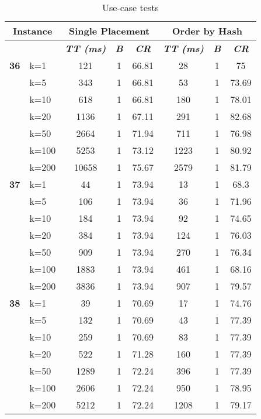     \begin{table}[htbp]
    \caption{Use-case tests}
    \centering
    \begin{tabular}{|l|l|c|c|c|c|c|c|}
    
    \multicolumn{ 2}{|c|}{\textbf{Instance}} & \multicolumn{ 3}{c|}{\textbf{Single Placement}} & \multicolumn{ 3}{c|}{\textbf{Order by Hash}} \\ \hline
    \multicolumn{ 2}{|l|}{} & \textbf{\textit{TT (ms)}} & \textbf{\textit{B}} & \textbf{\textit{CR}} & \textbf{\textit{TT (ms)}} & \textbf{\textit{B}} & \textbf{\textit{CR}} \\ \hline
    \multicolumn{1}{|r|}{\textbf{36}} & k=1 & 121 & 1 & 66.81 & 28 & 1 & 75 \\ 
     & k=5 & 343 & 1 & 66.81 & 53 & 1 & 73.69 \\ 
     & k=10 & 618 & 1 & 66.81 & 180 & 1 & 78.01 \\ 
     & k=20 & 1136 & 1 & 67.11 & 291 & 1 & 82.68 \\ 
     & k=50 & 2664 & 1 & 71.94 & 711 & 1 & 76.98 \\ 
     & k=100 & 5253 & 1 & 73.12 & 1223 & 1 & 80.92 \\ 
     & k=200 & 10658 & 1 & 75.67 & 2579 & 1 & 81.79 \\ \hline
    \multicolumn{1}{|r|}{\textbf{37}} & k=1 & 44 & 1 & 73.94 & 13 & 1 & 68.3 \\ 
     & k=5 & 106 & 1 & 73.94 & 36 & 1 & 71.96 \\ 
     & k=10 & 184 & 1 & 73.94 & 92 & 1 & 74.65 \\ 
     & k=20 & 384 & 1 & 73.94 & 124 & 1 & 76.03 \\ 
     & k=50 & 909 & 1 & 73.94 & 270 & 1 & 76.34 \\ 
     & k=100 & 1883 & 1 & 73.94 & 461 & 1 & 68.16 \\ 
     & k=200 & 3836 & 1 & 73.94 & 907 & 1 & 79.57 \\ \hline
    \multicolumn{1}{|r|}{\textbf{38}} & k=1 & 39 & 1 & 70.69 & 17 & 1 & 74.76 \\ 
     & k=5 & 132 & 1 & 70.69 & 43 & 1 & 77.39 \\ 
     & k=10 & 259 & 1 & 70.69 & 83 & 1 & 77.39 \\ 
     & k=20 & 522 & 1 & 71.28 & 160 & 1 & 77.39 \\ 
     & k=50 & 1289 & 1 & 72.24 & 396 & 1 & 77.39 \\ 
     & k=100 & 2606 & 1 & 72.24 & 950 & 1 & 78.95 \\ 
     & k=200 & 5212 & 1 & 72.24 & 1208 & 1 & 79.17 \\ \hline

\end{tabular}
\end{table}

